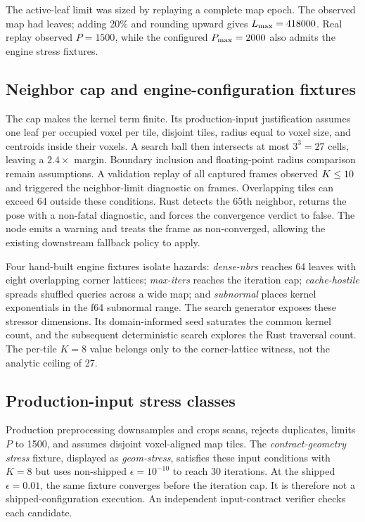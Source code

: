 The active-leaf limit was sized by replaying a complete map epoch. The observed map had
\runtimeLeavesObserved{} leaves; adding 20\% and rounding upward gives
$L_{\max}=418000$. Real replay observed $P=1500$, while the configured
$P_{\max}=2000$ also admits the engine stress fixtures.

\subsection{Neighbor cap and engine-configuration fixtures}
The  cap makes the kernel term finite. Its production-input justification assumes one
leaf per occupied voxel per tile, disjoint tiles, radius equal to voxel size, and centroids
inside their voxels. A search ball then intersects at most $3^3=27$ cells, leaving a
$2.4\times$ margin. Boundary inclusion and floating-point radius comparison remain
assumptions. A validation replay of all \runtimeValidationFrames{} captured frames
observed $K\le10$ and triggered the neighbor-limit diagnostic on
\runtimeNeighborLimitFrames{} frames. Overlapping tiles can exceed 64 outside these
conditions. Rust detects the 65th neighbor, returns the pose with a non-fatal
diagnostic, and forces the convergence verdict to false. The node emits a warning and treats
the frame as non-converged, allowing the existing downstream fallback policy to apply.

\label{sec:impl-fixtures}
Four hand-built engine fixtures isolate hazards: \emph{dense-nbrs} reaches 64 leaves
with eight overlapping corner lattices; \emph{max-iters} reaches the iteration cap;
\emph{cache-hostile} spreads shuffled queries across a wide map; and \emph{subnormal}
places kernel exponentials in the f64 subnormal range. The search generator exposes these
stressor dimensions. Its domain-informed seed saturates the common kernel count, and
the subsequent deterministic search explores the Rust traversal count. The per-tile $K=8$
value belongs only to the corner-lattice witness, not the analytic ceiling of 27.

\subsection{Production-input stress classes}
\label{sec:impl-legal}
Production preprocessing downsamples and crops scans, rejects duplicates, limits $P$ to
1500, and assumes disjoint voxel-aligned map tiles. The \emph{contract-geometry stress}
fixture, displayed as \emph{geom-stress}, satisfies these input conditions with $K=8$ but
uses non-shipped $\epsilon=10^{-10}$ to reach 30 iterations. At the shipped
$\epsilon=0.01$, the same fixture converges before the iteration cap.
It is therefore not a shipped-configuration execution. An independent input-contract
verifier checks each candidate.


